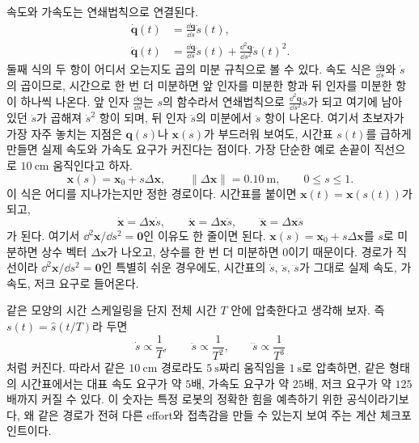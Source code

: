 속도와 가속도는 연쇄법칙으로 연결된다.
\begin{align}
  \dot{\bm{q}}(t)
  &=
  \frac{\dd \bm{q}}{\dd s}\dot{s}(t),
  \\
  \ddot{\bm{q}}(t)
  &=
  \frac{\dd \bm{q}}{\dd s}\ddot{s}(t)
  +
  \frac{\dd^2 \bm{q}}{\dd s^2}\dot{s}(t)^2.
\end{align}
둘째 식의 두 항이 어디서 오는지도 곱의 미분 규칙으로 볼 수 있다.
속도 식은 $\frac{\dd\bm{q}}{\dd s}$와 $\dot{s}$의 곱이므로, 시간으로 한 번 더 미분하면 앞 인자를 미분한 항과 뒤 인자를 미분한 항이 하나씩 나온다.
앞 인자 $\frac{\dd\bm{q}}{\dd s}$는 $s$의 함수라서 연쇄법칙으로 $\frac{\dd^2\bm{q}}{\dd s^2}\dot{s}$가 되고 여기에 남아 있던 $\dot{s}$가 곱해져 $\dot{s}^2$ 항이 되며, 뒤 인자 $\dot{s}$의 미분에서 $\ddot{s}$ 항이 나온다.
%
여기서 초보자가 가장 자주 놓치는 지점은 \(\bm{q}(s)\)나 \(\bm{x}(s)\)가 부드러워 보여도, 시간표 \(s(t)\)를 급하게 만들면 실제 속도와 가속도 요구가 커진다는 점이다.
가장 단순한 예로 손끝이 직선으로 \(10~\mathrm{cm}\) 움직인다고 하자.
\begin{equation}
  \bm{x}(s)
  =
  \bm{x}_0+s\Delta\bm{x},
  \qquad
  \|\Delta\bm{x}\|=0.10~\mathrm{m},
  \qquad
  0\le s\le 1.
  \label{eq:straight-path-time-scaling-checkpoint}
\end{equation}
이 식은 어디를 지나가는지만 정한 경로이다.
시간표를 붙이면 \(\bm{x}(t)=\bm{x}(s(t))\)가 되고,
\begin{equation}
  \dot{\bm{x}}
  =
  \Delta\bm{x}\dot{s},
  \qquad
  \ddot{\bm{x}}
  =
  \Delta\bm{x}\ddot{s},
  \qquad
  \dddot{\bm{x}}
  =
  \Delta\bm{x}\dddot{s}
  \label{eq:straight-path-time-derivatives}
\end{equation}
가 된다.
여기서 \(\dd^2\bm{x}/\dd s^2=\bm{0}\)인 이유도 한 줄이면 된다.
\(\bm{x}(s)=\bm{x}_0+s\Delta\bm{x}\)를 \(s\)로 미분하면 상수 벡터 \(\Delta\bm{x}\)가 나오고, 상수를 한 번 더 미분하면 0이기 때문이다.
%
경로가 직선이라 \(\dd^2\bm{x}/\dd s^2=\bm{0}\)인 특별히 쉬운 경우에도, 시간표의 \(\dot{s}\), \(\ddot{s}\), \(\dddot{s}\)가 그대로 실제 속도, 가속도, 저크 요구로 들어온다.

같은 모양의 시간 스케일링을 단지 전체 시간 \(T\) 안에 압축한다고 생각해 보자.
즉 \(s(t)=\hat{s}(t/T)\)라 두면
\[
  \dot{s}\propto \frac{1}{T},
  \qquad
  \ddot{s}\propto \frac{1}{T^2},
  \qquad
  \dddot{s}\propto \frac{1}{T^3}
\]
처럼 커진다.
따라서 같은 \(10~\mathrm{cm}\) 경로라도 \(5~\mathrm{s}\)짜리 움직임을 \(1~\mathrm{s}\)로 압축하면, 같은 형태의 시간표에서는 대표 속도 요구가 약 \(5\)배, 가속도 요구가 약 \(25\)배, 저크 요구가 약 \(125\)배까지 커질 수 있다.
이 숫자는 특정 로봇의 정확한 힘을 예측하기 위한 공식이라기보다, 왜 같은 경로가 전혀 다른 effort와 접촉감을 만들 수 있는지 보여 주는 계산 체크포인트이다.


